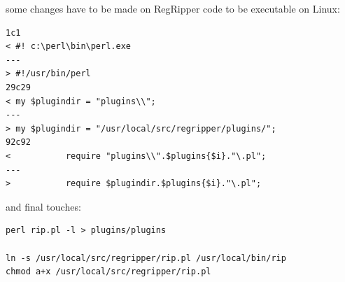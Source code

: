 \documentclass[a4paper,11pt,oneside]{report}
\begin{document}
some changes have to be made on RegRipper code to be executable on Linux:

\begin{verbatim}
1c1
< #! c:\perl\bin\perl.exe
---
> #!/usr/bin/perl
29c29
< my $plugindir = "plugins\\";
---
> my $plugindir = "/usr/local/src/regripper/plugins/";
92c92
< 			require "plugins\\".$plugins{$i}."\.pl";
---
> 			require $plugindir.$plugins{$i}."\.pl";
\end{verbatim}

and final touches:

\begin{verbatim}
perl rip.pl -l > plugins/plugins

ln -s /usr/local/src/regripper/rip.pl /usr/local/bin/rip
chmod a+x /usr/local/src/regripper/rip.pl
\end{verbatim}
\end{document}
